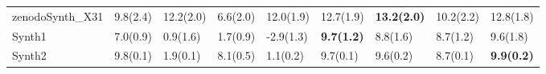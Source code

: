 \begin{tabular}{|l|llllllll|}
zenodoSynth\_X31  &             9.8(2.4) &           12.2(2.0) &    6.6(2.0) &           12.0(1.9) &           12.7(1.9) &  \bfseries 13.2(2.0) &  10.2(2.2) &           12.8(1.8) \\
Synth1            &             7.0(0.9) &            0.9(1.6) &    1.7(0.9) &           -2.9(1.3) &  \bfseries 9.7(1.2) &             8.8(1.6) &   8.7(1.2) &            9.6(1.8) \\
Synth2            &             9.8(0.1) &            1.9(0.1) &    8.1(0.5) &            1.1(0.2) &            9.7(0.1) &             9.6(0.2) &   8.7(0.1) &  \bfseries 9.9(0.2) \\
\hline
\end{tabular}